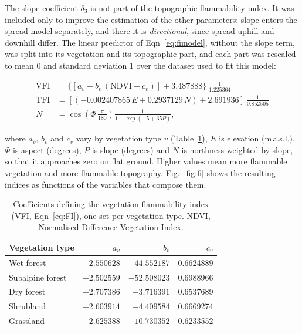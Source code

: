\documentclass[11pt,a4paper]{article}
\begin{document}
The slope coefficient $\delta_3$ is not part of the topographic flammability
index. It was included only to improve the estimation of the other parameters:
slope enters the spread model separately, and there it is \textit{directional},
since spread uphill and downhill differ. The linear predictor of
Eqn~\ref{eq:fimodel}, without the slope term, was split into its vegetation and
its topographic part, and each part was rescaled to mean 0 and standard
deviation 1 over the dataset used to fit this model:

\begin{equation}
\label{eq:FI}
\begin{aligned}
    \mathrm{VFI} &= \{[a_v + b_v \, (\mathrm{NDVI} - c_v)] + 3.487888\} \ \frac{1}{1.225364} \\
    \mathrm{TFI} &= [(-0.002407865 \, E + 0.2937129 \, N) + 2.691936] \ \frac{1}{0.852505} \\
    N &= \cos \left(\Phi \, \frac{\pi}{180}\right) \frac{1}{1 + \exp(-5 + 35 P)},
\end{aligned}
\end{equation}

\noindent where $a_v$, $b_v$ and $c_v$ vary by vegetation type $v$
(Table~\ref{tab:vfi-params}), $E$ is elevation (m\,a.s.l.), $\Phi$ is aspect
(degrees), $P$ is slope (degrees) and $N$ is northness weighted by slope, so
that it approaches zero on flat ground. Higher values mean more flammable
vegetation and more flammable topography. Fig.~\ref{fig:fi} shows the resulting
indices as functions of the variables that compose them.

\begin{table}[htbp]
\centering
\caption{Coefficients defining the vegetation flammability index (VFI,
Eqn~\ref{eq:FI}), one set per vegetation type. NDVI, Normalised Difference
Vegetation Index.}
\label{tab:vfi-params}
\begin{tabular}{lrrr}
\toprule
Vegetation type & $a_v$ & $b_v$ & $c_v$ \\
\midrule
Wet forest       & $-2.550628$ & $-44.552187$ & 0.6624889 \\
Subalpine forest & $-2.502559$ & $-52.508023$ & 0.6988966 \\
Dry forest       & $-2.707386$ & $-3.716391$  & 0.6537689 \\
Shrubland        & $-2.603914$ & $-4.409584$  & 0.6669274 \\
Grassland        & $-2.625388$ & $-10.730352$ & 0.6233552 \\
\bottomrule
\end{tabular}
\end{table}
\end{document}
